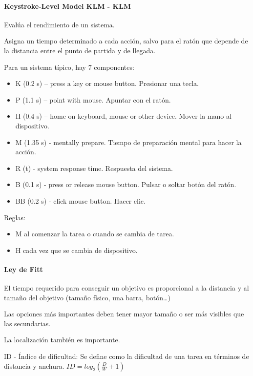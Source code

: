 \documentclass[12pt, twoside, openright]{report} %
\begin{document}
\paragraph{Keystroke-Level Model KLM - KLM}
Evalúa el rendimiento de un sistema.


Asigna un tiempo determinado a cada acción, salvo para el
ratón que depende de la distancia entre el punto de partida y
de llegada.

Para un sistema típico, hay 7 componentes:

\begin{itemize}
	\item K (0.2 s) -- press a key or mouse button. Presionar una
	      tecla.
	\item P (1.1 s) -- point with mouse. Apuntar con el ratón.
	\item H (0.4 s) -- home on keyboard, mouse or other device. Mover
	      la mano al dispositivo.
	\item M (1.35 s) - mentally prepare. Tiempo de preparación mental
	      para hacer la acción.
	\item R (t) - system response time. Respuesta del sistema.
	\item B (0.1 s) - press or release mouse button. Pulsar o soltar
	      botón del ratón.
	\item BB (0.2 s) - click mouse button. Hacer clic.
\end{itemize}

Reglas:

\begin{itemize}
	\item M al comenzar la tarea o cuando se cambia de tarea.
	\item H cada vez que se cambia de dispositivo.
\end{itemize}

\paragraph{Ley de Fitt}
El tiempo requerido para conseguir un objetivo es
proporcional a la distancia y al tamaño del objetivo (tamaño
físico, una barra, botón\ldots)



Las opciones más importantes deben tener mayor tamaño o ser
más visibles que las secundarias.

La localización también es importante.

ID - Índice de dificultad: Se define como la dificultad de una
tarea en términos de distancia y anchura.
\(ID = log_2 ( \frac {D} {W} + 1)\)
\end{document}
